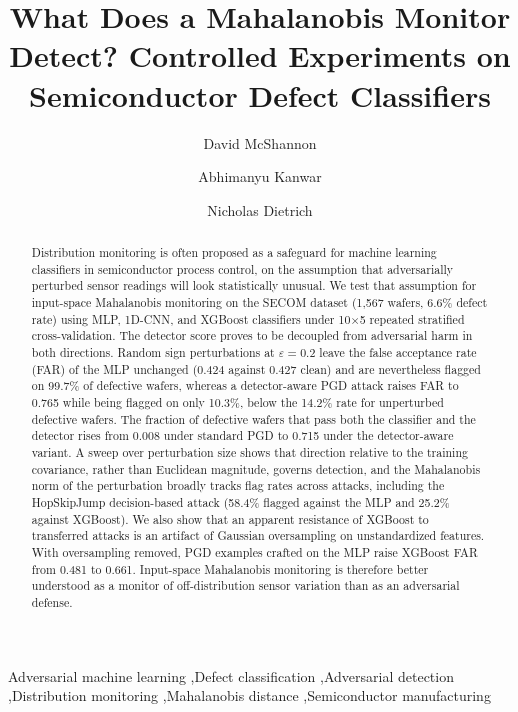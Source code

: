 \documentclass[preprint,12pt,authoryear]{elsarticle}
\begin{document}
\begin{frontmatter}

\title{What Does a Mahalanobis Monitor Detect? Controlled Experiments on Semiconductor Defect Classifiers}

\author[ind]{David McShannon}
\author[cam]{Abhimanyu Kanwar}
\author[tor]{Nicholas Dietrich}

\address[ind]{Independent Researcher, Dallas, Texas, United States}
\address[cam]{University of Cambridge, The Old Schools, Trinity Lane, Cambridge CB2 1TN, United Kingdom}
\address[tor]{University of Toronto, 27 King's College Circle, Toronto, ON M5S 1A1, Canada}

\begin{abstract}
Distribution monitoring is often proposed as a safeguard for machine learning classifiers in semiconductor process control, on the assumption that adversarially perturbed sensor readings will look statistically unusual. We test that assumption for input-space Mahalanobis monitoring on the SECOM dataset (1,567 wafers, 6.6\% defect rate) using MLP, 1D-CNN, and XGBoost classifiers under 10$\times$5 repeated stratified cross-validation. The detector score proves to be decoupled from adversarial harm in both directions. Random sign perturbations at $\varepsilon=0.2$ leave the false acceptance rate (FAR) of the MLP unchanged (0.424 against 0.427 clean) and are nevertheless flagged on 99.7\% of defective wafers, whereas a detector-aware PGD attack raises FAR to 0.765 while being flagged on only 10.3\%, below the 14.2\% rate for unperturbed defective wafers. The fraction of defective wafers that pass both the classifier and the detector rises from 0.008 under standard PGD to 0.715 under the detector-aware variant. A sweep over perturbation size shows that direction relative to the training covariance, rather than Euclidean magnitude, governs detection, and the Mahalanobis norm of the perturbation broadly tracks flag rates across attacks, including the HopSkipJump decision-based attack (58.4\% flagged against the MLP and 25.2\% against XGBoost). We also show that an apparent resistance of XGBoost to transferred attacks is an artifact of Gaussian oversampling on unstandardized features. With oversampling removed, PGD examples crafted on the MLP raise XGBoost FAR from 0.481 to 0.661. Input-space Mahalanobis monitoring is therefore better understood as a monitor of off-distribution sensor variation than as an adversarial defense.
\end{abstract}

\begin{keyword}
Adversarial machine learning \sep Defect classification \sep Adversarial detection \sep Distribution monitoring \sep Mahalanobis distance \sep Semiconductor manufacturing
\end{keyword}

\end{frontmatter}
\end{document}
